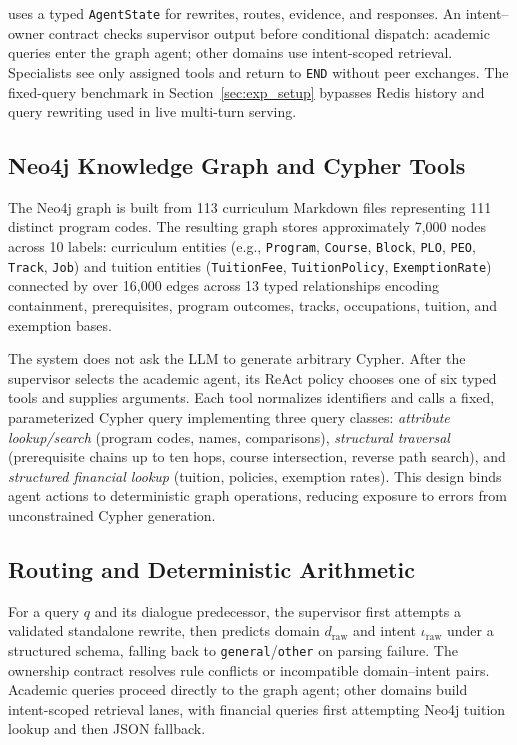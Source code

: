 \system{} uses a typed \texttt{AgentState} for rewrites, routes, evidence, and responses. An intent--owner contract checks supervisor output before conditional dispatch: academic queries enter the graph agent; other domains use intent-scoped retrieval. Specialists see only assigned tools and return to \texttt{END} without peer exchanges. The fixed-query benchmark in Section~\ref{sec:exp_setup} bypasses Redis history and query rewriting used in live multi-turn serving.

\subsection{Neo4j Knowledge Graph and Cypher Tools}
\label{sec:neo4j_graph}

The Neo4j graph is built from 113 curriculum Markdown files representing 111 distinct program codes. The resulting graph stores approximately 7{,}000 nodes across 10 labels: curriculum entities (e.g., \texttt{Program}, \texttt{Course}, \texttt{Block}, \texttt{PLO}, \texttt{PEO}, \texttt{Track}, \texttt{Job}) and tuition entities (\texttt{TuitionFee}, \texttt{TuitionPolicy}, \texttt{ExemptionRate}) connected by over 16{,}000 edges across 13 typed relationships encoding containment, prerequisites, program outcomes, tracks, occupations, tuition, and exemption bases.

The system does not ask the LLM to generate arbitrary Cypher. After the supervisor selects the academic agent, its ReAct policy chooses one of six typed tools and supplies arguments. Each tool normalizes identifiers and calls a fixed, parameterized Cypher query implementing three query classes: \emph{attribute lookup/search} (program codes, names, comparisons), \emph{structural traversal} (prerequisite chains up to ten hops, course intersection, reverse path search), and \emph{structured financial lookup} (tuition, policies, exemption rates). This design binds agent actions to deterministic graph operations, reducing exposure to errors from unconstrained Cypher generation.

\subsection{Routing and Deterministic Arithmetic}
\label{sec:algorithms}

For a query $q$ and its dialogue predecessor, the supervisor first attempts a validated standalone rewrite, then predicts domain $d_{\mathrm{raw}}$ and intent $\iota_{\mathrm{raw}}$ under a structured schema, falling back to \texttt{general}/\texttt{other} on parsing failure. The ownership contract resolves rule conflicts or incompatible domain--intent pairs. Academic queries proceed directly to the graph agent; other domains build intent-scoped retrieval lanes, with financial queries first attempting Neo4j tuition lookup and then JSON fallback.

